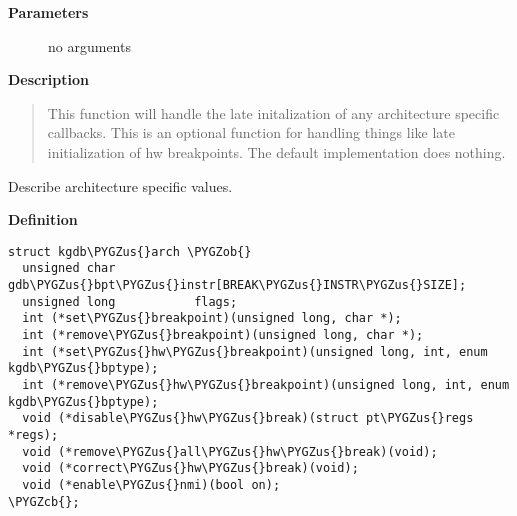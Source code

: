 \documentclass[a4paper,8pt,english]{sphinxmanual}
\def\PYGZus{\char`\_}
\def\PYGZob{\char`\{}
\def\PYGZcb{\char`\}}
\begin{document}
\textbf{Parameters}
\begin{description}
\item[{}] \leavevmode
no arguments

\end{description}

\textbf{Description}
\begin{quote}

This function will handle the late initalization of any
architecture specific callbacks.  This is an optional function for
handling things like late initialization of hw breakpoints.  The
default implementation does nothing.
\end{quote}

\begin{fulllineitems}
\label{dev-tools/kgdb:c.kgdb_arch}
Describe architecture specific values.

\end{fulllineitems}


\textbf{Definition}

\begin{Verbatim}[commandchars=\\\{\}]
struct kgdb\PYGZus{}arch \PYGZob{}
  unsigned char           gdb\PYGZus{}bpt\PYGZus{}instr[BREAK\PYGZus{}INSTR\PYGZus{}SIZE];
  unsigned long           flags;
  int (*set\PYGZus{}breakpoint)(unsigned long, char *);
  int (*remove\PYGZus{}breakpoint)(unsigned long, char *);
  int (*set\PYGZus{}hw\PYGZus{}breakpoint)(unsigned long, int, enum kgdb\PYGZus{}bptype);
  int (*remove\PYGZus{}hw\PYGZus{}breakpoint)(unsigned long, int, enum kgdb\PYGZus{}bptype);
  void (*disable\PYGZus{}hw\PYGZus{}break)(struct pt\PYGZus{}regs *regs);
  void (*remove\PYGZus{}all\PYGZus{}hw\PYGZus{}break)(void);
  void (*correct\PYGZus{}hw\PYGZus{}break)(void);
  void (*enable\PYGZus{}nmi)(bool on);
\PYGZcb{};
\end{Verbatim}
\end{document}

